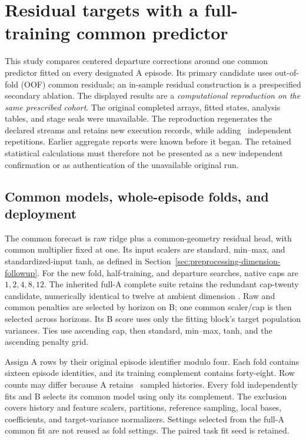 \section{Residual targets with a full-training common predictor}
\label{sec:crossfit-residual-followup}

This study compares centered departure corrections around one common
predictor fitted on every designated A episode. Its primary candidate uses
out-of-fold (OOF) common residuals; an in-sample residual construction is
a prespecified secondary ablation. The displayed results are a
\emph{computational reproduction on the same prescribed cohort}.
The original completed arrays, fitted states, analysis tables, and stage
seals were unavailable. The reproduction regenerates the declared streams
and retains new execution records, while adding
\CFRAdditionalRepetitions\ independent repetitions. Earlier aggregate
reports were known before it began. The retained statistical calculations
must therefore not be presented as a new independent confirmation or as
authentication of the unavailable original run.

\subsection{Common models, whole-episode folds, and deployment}

The common forecast is raw ridge plus a common-geometry residual head,
with common multiplier fixed at one. Its input scalers are standard,
min--max, and standardized-input tanh, as defined in
Section~\ref{sec:preprocessing-dimension-followup}. For the new fold,
half-training, and departure searches, native caps are $1,2,4,8,12$.
The inherited full-A complete suite retains the redundant cap-twenty
candidate, numerically identical to twelve at ambient dimension
\CFRHistory. Raw and common penalties are selected by horizon on B;
one common scaler/cap is then selected across horizons. Its B score uses
only the fitting block's target population variances. Ties use ascending
cap, then standard, min--max, tanh, and the ascending penalty grid.

Assign A rows by their original episode identifier modulo four. Each fold
contains sixteen episode identities, and its training complement contains
forty-eight. Row counts may differ because A retains \CFRRowsA\ sampled
histories. Every fold independently fits and B selects its common model
using only its complement. The exclusion covers history and feature
scalers, partitions, reference sampling, local bases, coefficients, and
target-variance normalizers. Settings selected from the full-A common fit
are not reused as fold settings. The paired task fit seed is retained.

